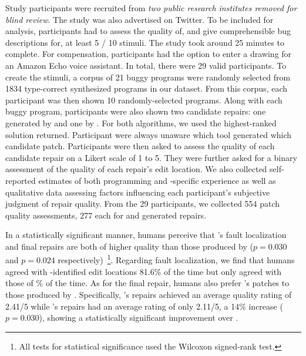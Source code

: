 %
Study participants were recruited from \emph{two public research
institutes removed for blind review}. The study was also advertised on Twitter.
To be included for analysis, participants had to assess the quality of, and give
comprehensible bug descriptions for, at least 5 / 10 stimuli. The study took around
25 minutes to complete. For compensation, participants had the option to enter a
drawing for an Amazon Echo voice assistant. In total, there were
29 valid participants.
%
To create the stimuli, a corpus of 21 buggy programs were randomly selected from
1834 type-correct synthesized programs in our dataset. From this corpus, each
participant was then shown 10 randomly-selected programs. Along with each buggy
program, participants were also shown two candidate repairs: one generated by
\toolname and one by \seminal. For both algorithms, we used the highest-ranked
solution returned. Participant were always unaware which tool generated which
candidate patch. Participants were then asked to assess the quality of each
candidate repair on a Likert scale of 1 to 5. They were further asked for a
binary assessment of the quality of each repair's edit location.
We also collected self-reported estimates of both programming and
\ocaml-specific experience as well as qualitative data assessing factors
influencing each participant's subjective judgment of repair quality.
From the 29 participants, we collected 554 patch quality assessments, 277 each
for \toolname and \seminal generated repairs.


%
In a statistically significant manner, humans perceive that
\toolname's fault localization and final repairs are both
of higher quality than those produced by \seminal ($p=0.030$
and $p=0.024$ respectively)~\footnote{All tests for statistical
significance used the Wilcoxon signed-rank test.}.
%
Regarding fault localization, we find that humans agreed
with \toolname-identified edit locations 81.6\% of the time
but only agreed with those of \% of the time.
%
%
As for the final repair, humans also prefer \toolname's patches
to those produced by \seminal. Specifically, \toolname's repairs
achieved an average quality rating of 2.41/5 while \seminal's
repairs had an average rating of only 2.11/5, a 14\% increase ($p=0.030$),
showing a statistically significant improvement over \seminal.

